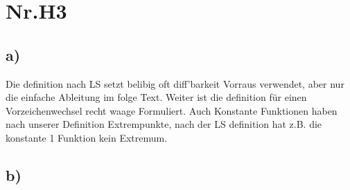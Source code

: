 \section*{Nr.H3}

\subsection*{a)}

Die definition nach LS setzt belibig oft diff'barkeit Vorraus verwendet,
aber nur die einfache Ableitung im folge Text.
Weiter ist die definition für einen Vorzeichenwechsel recht waage Formuliert.
Auch Konstante Funktionen haben nach unserer Definition Extrempunkte, nach der LS definition
hat z.B. die konstante 1 Funktion kein Extremum.


\subsection*{b)}